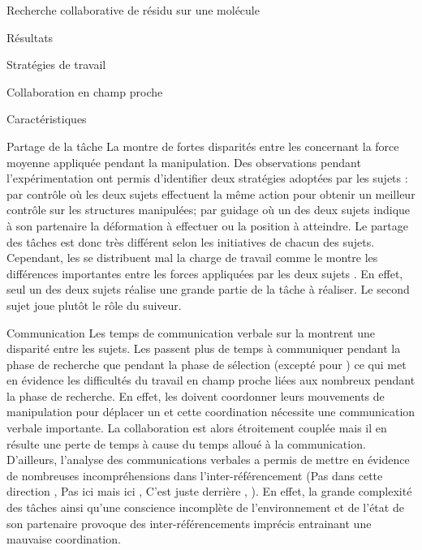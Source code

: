 \documentclass[myfrancais,ngerman,english,french]{mythesis}
\begin{document}
\begin{mychapter}{Recherche collaborative de résidu sur une molécule}
\begin{mysection}{Résultats}
\begin{mysubsection}{Stratégies de travail}
\begin{mysubsubsection}{Collaboration en champ proche}
\begin{myparagraph}{Caractéristiques}
					\end{myparagraph}
					\begin{myparagraph}{Partage de la tâche}
						La  montre de fortes disparités entre les  concernant la force moyenne appliquée pendant la manipulation.
						Des observations pendant l'expérimentation ont permis d'identifier deux stratégies adoptées par les sujets : \og par contrôle \fg où les deux sujets effectuent la même action pour obtenir un meilleur contrôle sur les structures manipulées; \og par guidage \fg où un des deux sujets indique à son partenaire la déformation à effectuer ou la position à atteindre.
						Le partage des tâches est donc très différent selon les initiatives de chacun des sujets.
						Cependant, les  se distribuent mal la charge de travail comme le montre les différences importantes entre les forces appliquées par les deux sujets .
						En effet, seul un des deux sujets réalise une grande partie de la tâche à réaliser.
						Le second sujet joue plutôt le rôle du suiveur.
					\end{myparagraph}
					\begin{myparagraph}{Communication}
						Les temps de communication verbale sur la  montrent une disparité entre les sujets.
						Les  passent plus de temps à communiquer pendant la phase de recherche que pendant la phase de sélection (excepté pour ) ce qui met en évidence les difficultés du travail en champ proche liées aux nombreux  pendant la phase de recherche.
						En effet, les  doivent coordonner leurs mouvements de manipulation pour déplacer un  et cette coordination nécessite une communication verbale importante.
						La collaboration est alors étroitement couplée mais il en résulte une perte de temps à cause du temps alloué à la communication.
						D'ailleurs, l'analyse des communications verbales a permis de mettre en évidence de nombreuses incompréhensions dans l'inter-référencement (\og Pas dans cette direction \fg, \og Pas ici mais ici \fg, \og C'est juste derrière \fg, \myetc).
						En effet, la grande complexité des tâches ainsi qu'une conscience incomplète de l'environnement et de l'état de son partenaire provoque des inter-référencements imprécis entrainant une mauvaise coordination.

\end{myparagraph}
\end{mysubsubsection}
\end{mysubsection}
\end{mysection}
\end{mychapter}
\end{document}
